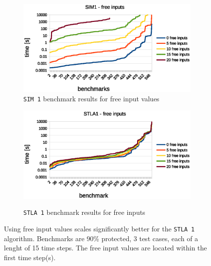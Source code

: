 \documentclass[a4paper,10pt]{article}
\begin{document}
\begin{figure}[!hbt]
\centering
  \begin{subfigure}[b]{0.95\linewidth}  \centering
    \includegraphics[width=\linewidth]{img/sim_free_inputs.eps}
    \caption{\texttt{SIM 1} benchmark results for free input values}
    \label{free_inputs_sim}
  \end{subfigure}
  \begin{subfigure}[b]{0.95\linewidth}  \centering
    \includegraphics[width=\linewidth]{img/stla1_free_inputs.eps}
    \label{free_inputs_stla}
    \caption{\texttt{STLA 1}  benchmark results for free inputs}
  \end{subfigure}
  \caption{Using free input values scales significantly better for the \texttt{STLA 1} algorithm. Benchmarks are 90\% protected, 3 test cases, each of a lenght of 15 time steps. The free input values are located within the first time step(s). }
\label{fig_free_inputs}
\end{figure}
\end{document}
